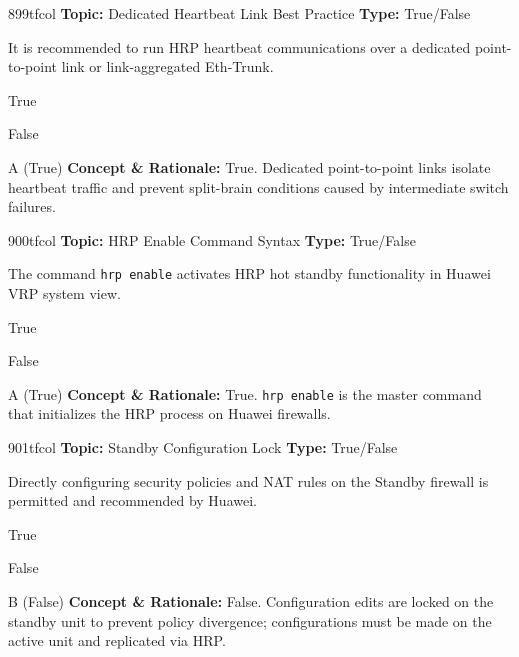 \begin{qcard}{899}{tfcol}
\textcolor{darkslate!75}{\small\textbf{Topic:} Dedicated Heartbeat Link Best Practice \hfill \textbf{Type:} True/False}\vspace{0.4em}\par
It is recommended to run HRP heartbeat communications over a dedicated point-to-point link or link-aggregated Eth-Trunk.
\begin{qoptions}
\item True
\item False
\end{qoptions}
\end{qcard}
\nopagebreak
\begin{explainbox}{A (True)}
\textbf{Concept \& Rationale:} True. Dedicated point-to-point links isolate heartbeat traffic and prevent split-brain conditions caused by intermediate switch failures.
\end{explainbox}

\begin{qcard}{900}{tfcol}
\textcolor{darkslate!75}{\small\textbf{Topic:} HRP Enable Command Syntax \hfill \textbf{Type:} True/False}\vspace{0.4em}\par
The command \texttt{hrp enable} activates HRP hot standby functionality in Huawei VRP system view.
\begin{qoptions}
\item True
\item False
\end{qoptions}
\end{qcard}
\nopagebreak
\begin{explainbox}{A (True)}
\textbf{Concept \& Rationale:} True. \texttt{hrp enable} is the master command that initializes the HRP process on Huawei firewalls.
\end{explainbox}

\begin{qcard}{901}{tfcol}
\textcolor{darkslate!75}{\small\textbf{Topic:} Standby Configuration Lock \hfill \textbf{Type:} True/False}\vspace{0.4em}\par
Directly configuring security policies and NAT rules on the Standby firewall is permitted and recommended by Huawei.
\begin{qoptions}
\item True
\item False
\end{qoptions}
\end{qcard}
\nopagebreak
\begin{explainbox}{B (False)}
\textbf{Concept \& Rationale:} False. Configuration edits are locked on the standby unit to prevent policy divergence; configurations must be made on the active unit and replicated via HRP.
\end{explainbox}

